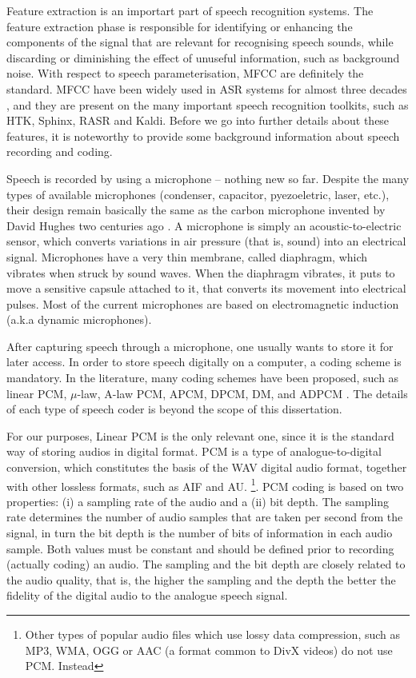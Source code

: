 Feature extraction is an importart part of speech recognition systems. The feature extraction 
phase is responsible for identifying or enhancing the components of the signal that are relevant 
for recognising speech sounds, while discarding or diminishing the effect of unuseful information, 
such as background noise. With respect to speech parameterisation, \ac{MFCC} are definitely the
standard. \ac{MFCC} have been widely used in \ac{ASR} systems for almost three decades \cite{Davis1980}, and 
they are present on the many important speech recognition toolkits, such as \ac{HTK}, Sphinx, \ac{RASR} and Kaldi.
Before we go into further details about these features, it is noteworthy to provide some background information about speech recording and coding.

Speech is recorded by using a microphone -- nothing new so far.
Despite the many types of available microphones (condenser, capacitor, pyezoeletric, laser, etc.), their design
remain basically the same as the carbon microphone invented by David Hughes two centuries ago \cite{Robjohns2010}.
A microphone is simply an acoustic-to-electric sensor, which converts variations in air pressure (that is, sound)
into an electrical signal. Microphones have a very thin membrane, called diaphragm, which vibrates when struck by 
sound waves.  When the diaphragm vibrates, it puts to move a sensitive capsule attached to it, 
that converts its movement into electrical pulses. Most of the current microphones are based on electromagnetic induction (a.k.a dynamic microphones).

After capturing speech through a microphone, one usually wants to store it for later access. In order
to store speech digitally on a computer, a coding scheme is mandatory. In the literature, many coding schemes have
been proposed, such as linear PCM, $\mu$-law, A-law PCM, APCM, DPCM, DM, and ADPCM \cite{Huang2001}. The details of 
each type of speech coder is beyond the scope of this dissertation. 

For our purposes, Linear PCM is the only relevant one, since it is the standard way of storing audios in digital format. \ac{PCM} is a type of analogue-to-digital conversion, which constitutes the basis of the WAV digital audio format, together
with other lossless formats, such as AIF and AU.
\footnote{Other types of popular audio files which use lossy data compression, such as MP3, WMA, OGG or AAC (a format common to 
DivX videos) do not use PCM. Instead}. 
PCM coding is based on two properties: (i) a sampling rate of the audio and a (ii) bit depth. The sampling rate determines the
number of audio samples that are taken per second from the signal, in turn the bit depth is the number of bits 
of information in each audio sample. Both values must be constant and should be defined prior to recording (actually coding) an audio. 
The sampling and the bit depth are closely related to the audio quality, that is, the higher the sampling and the depth
the better the fidelity of the digital audio to the analogue speech signal.

